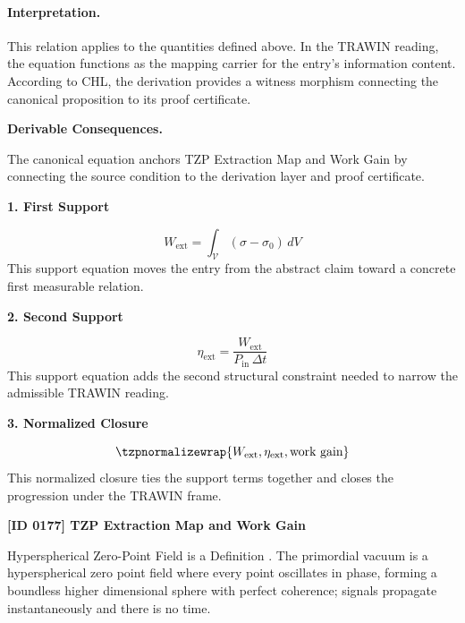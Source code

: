 \paragraph{Interpretation.}
This relation applies to the quantities defined above. In the TRAWIN reading, the equation functions as the mapping carrier for the entry’s information content. According to CHL, the derivation provides a witness morphism connecting the canonical proposition to its proof certificate.

\par\vspace{0.35em}
\noindent\textbf{Derivable Consequences.}\quad
\begingroup
\footnotesize
\raggedright
The canonical equation anchors TZP Extraction Map and Work Gain by connecting the source condition to the derivation layer and proof certificate.
\par\endgroup

\noindent\textbf{1. First Support}\par
\[
W_{\mathrm{ext}} = \int_{\mathcal{V}} (\sigma - \sigma_0)\, dV
\]
\noindent This support equation moves the entry from the abstract claim toward a concrete first measurable relation.\par
\noindent\textbf{2. Second Support}\par
\[
\eta_{\mathrm{ext}} = \frac{W_{\mathrm{ext}}}{P_{\mathrm{in}}\,\Delta t}
\]
\noindent This support equation adds the second structural constraint needed to narrow the admissible TRAWIN reading.\par
\noindent\textbf{3. Normalized Closure}\par
\[
\tzpnormalizewrap{W_{\mathrm{ext}},\eta_{\mathrm{ext}},\text{work gain}}
\]
\noindent This normalized closure ties the support terms together and closes the progression under the TRAWIN frame.\par

\clearpage
\noindent\textbf{[ID 0177] TZP Extraction Map and Work Gain}\par
\vspace{0.35em}
\begingroup\small
{}
Hyperspherical Zero-Point Field is a Definition  . The primordial vacuum is a hyperspherical zero point field where every point oscillates in phase, forming a boundless higher dimensional sphere with perfect coherence; signals propagate instantaneously and there is no time.  

